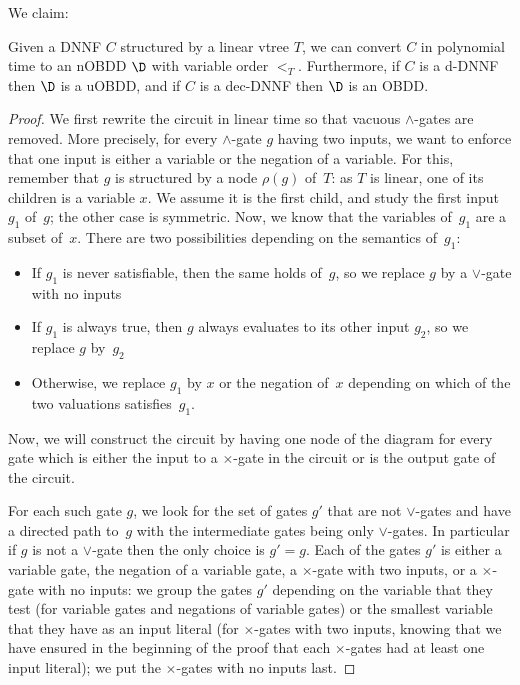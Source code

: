 We claim:

\begin{lemma}
  Given a DNNF $C$ structured by a linear vtree $T$, we can convert $C$ in
  polynomial time to an nOBDD $\D$ with variable order $<_T$. Furthermore, if
  $C$ is a d-DNNF then $\D$ is a uOBDD, and if $C$ is a dec-DNNF then $\D$ is
  an OBDD.
\end{lemma}


\begin{proof}
  We first rewrite the circuit in linear time so that vacuous $\land$-gates are
  removed. More precisely, for every $\land$-gate $g$ having two inputs, we
want to enforce that one input is either a variable or the negation of a
  variable. For this, remember that $g$ is structured by a node $\rho(g)$
  of~$T$: as $T$ is linear, one of its children is a variable $x$. We assume it is
  the first child, and study the first input $g_1$ of~$g$; the other case is
  symmetric. Now, we know that the variables of~$g_1$ are a subset of~$x$.
  There are two possibilities depending on the semantics of~$g_1$:
  \begin{itemize}
    \item If $g_1$ is never satisfiable, then the same holds of~$g$, so we
      replace $g$ by a $\lor$-gate with no inputs
    \item If $g_1$ is always true, then $g$ always evaluates to its other
      input $g_2$, so we replace $g$ by~$g_2$
    \item Otherwise, we replace $g_1$ by $x$ or the negation of~$x$ depending
      on which of the two valuations satisfies~$g_1$.
  \end{itemize}

  Now, we will construct the circuit by having one node of the diagram for every
  gate which is either the input to a $\times$-gate in the circuit or is the
  output gate of the circuit.

  For each such gate $g$, we look for the set of gates $g'$ that are not
  $\lor$-gates and have a directed path to~$g$ with the intermediate
  gates being only $\lor$-gates. In particular if $g$ is not a $\lor$-gate then
  the only choice is $g'=g$. Each of the gates $g'$ is either a variable gate,
  the negation of a variable gate,
  a $\times$-gate with two inputs, or a $\times$-gate with no inputs: we group
  the gates $g'$ depending on the variable that they test (for variable gates
  and negations of variable gates)
  or the smallest variable that they have as an input literal (for
  $\times$-gates with two inputs, knowing that we have ensured in the beginning
  of the proof that each $\times$-gates had at least one input literal); we put
  the $\times$-gates with no inputs last.


\end{proof}
